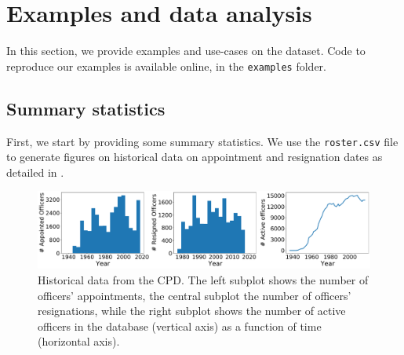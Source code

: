 
\section{Examples and data analysis} \label{sec:analysis}

In this section, we provide examples and use-cases on the dataset. Code to reproduce our examples is available online, in the \texttt{examples} folder.

\subsection{Summary statistics}

First, we start by providing some summary statistics. We use the  \texttt{roster.csv} file to generate figures on historical data on appointment and resignation dates as detailed in .

\begin{figure}[h] 
	\includegraphics[width=\textwidth]{figs/history} 
	\caption{Historical data from the CPD. The left subplot shows the number of officers' appointments, the central subplot the number of officers' resignations, while the right subplot shows the number of active officers in the database (vertical axis) as a function of time (horizontal axis).} \label{fig:history}
\end{figure}


